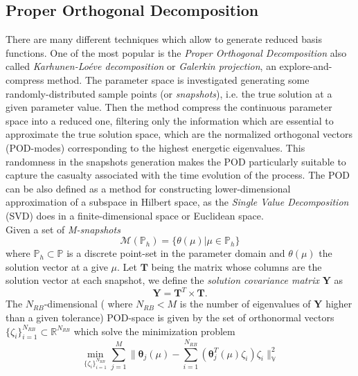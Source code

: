\documentclass[3p]{article}
\begin{document}

\subsection*{Proper Orthogonal Decomposition}
\indent There are many different techniques which allow to generate reduced basis functions. One of the most popular is the \textit{Proper Orthogonal Decomposition} also called \textit{Karhunen-Lo{\'e}ve decomposition} or \textit{Galerkin projection}, an explore-and-compress method. The parameter space is investigated generating some randomly-distributed sample points (or \textit{snapshots}), i.e. the true solution at a given parameter value. Then the method compress the continuous parameter space into a reduced one, filtering only the information which are essential to approximate the true solution space, which are the normalized orthogonal vectors (POD-modes) corresponding to the highest energetic eigenvalues. This randomness in the snapshots generation makes the POD particularly suitable to capture the casualty associated with the time evolution of the process. The POD can be also defined as a method for constructing lower-dimensional approximation of a subspace in Hilbert space, as the \textit{Single Value Decomposition} (SVD) does in a finite-dimensional space or Euclidean space.\\Given a set of \textit{M-snapshots} 
\begin{equation}
\mathcal{M}(\mathbb{P}_{h}) = \lbrace\theta(\mu)\vert\mu \in \mathbb{P}_{h}\rbrace
\end{equation}
where $\mathbb{P}_{h} \subset \mathbb{P}$ is a discrete point-set in the parameter domain and $\theta(\mu)$ the solution vector at a give $\mu$. Let $\mathbf{T}$ being the matrix whose columns are the solution vector at each snapshot, we define the \textit{solution covariance matrix} $\mathbf{Y}$ as
\begin{equation}
\mathbf{Y} = \mathbf{T}^{T} \times \mathbf{T}.
\label{eq:covarianceMatrix}
\end{equation}
The $N_{RB}$-dimensional ( where $N_{RB} < M$ is the number of eigenvalues of $\mathbf{Y}$ higher than a given tolerance) POD-space is given by the set of orthonormal vectors $\lbrace \zeta_{i} \rbrace_{i=1}^{N_{RB}} \subset \mathbb{R}^{N_{RB}}$ which solve the minimization problem \\
\indent
\begin{equation}
\min_{\lbrace\zeta_{i}\rbrace_{i=1}^{N_{RB}}}\sum_{j=1}^{M} 
\| \mathbold{\theta}_{j}(\mu) - \sum_{i=1}^{N_{RB}}(\mathbold{\theta}_{j}^{T}(\mu)\zeta_{i})\zeta_i\|_{\mathbb{V}}^{2}
\label{eq:minPOD}
\end{equation}
\end{document}
